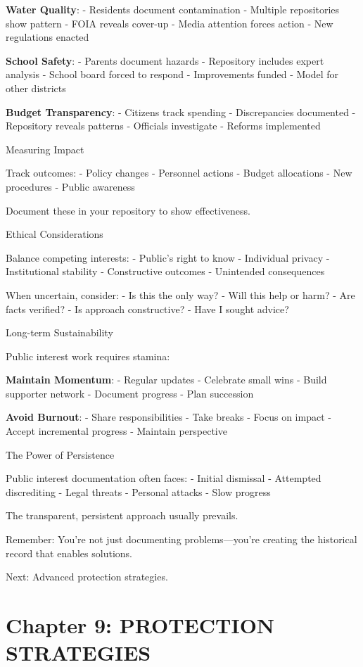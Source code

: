 \textbf{Water Quality}: - Residents document contamination - Multiple
repositories show pattern - FOIA reveals cover-up - Media attention
forces action - New regulations enacted

\textbf{School Safety}: - Parents document hazards - Repository includes
expert analysis - School board forced to respond - Improvements funded -
Model for other districts

\textbf{Budget Transparency}: - Citizens track spending - Discrepancies
documented - Repository reveals patterns - Officials investigate -
Reforms implemented

Measuring Impact

Track outcomes: - Policy changes - Personnel actions - Budget
allocations - New procedures - Public awareness

Document these in your repository to show effectiveness.

Ethical Considerations

Balance competing interests: - Public's right to know - Individual
privacy - Institutional stability - Constructive outcomes - Unintended
consequences

When uncertain, consider: - Is this the only way? - Will this help or
harm? - Are facts verified? - Is approach constructive? - Have I sought
advice?

Long-term Sustainability

Public interest work requires stamina:

\textbf{Maintain Momentum}: - Regular updates - Celebrate small wins -
Build supporter network - Document progress - Plan succession

\textbf{Avoid Burnout}: - Share responsibilities - Take breaks - Focus
on impact - Accept incremental progress - Maintain perspective

The Power of Persistence

Public interest documentation often faces: - Initial dismissal -
Attempted discrediting - Legal threats - Personal attacks - Slow
progress

The transparent, persistent approach usually prevails.

Remember: You're not just documenting problems---you're creating the
historical record that enables solutions.

Next: Advanced protection strategies.

\section{Chapter 9: PROTECTION
STRATEGIES}\label{chapter-9-protection-strategies}

